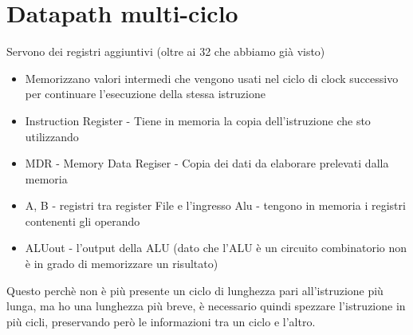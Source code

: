 \documentclass[12pt, a4paper, openany]{book}
\begin{document}
\section{Datapath multi-ciclo}
Servono dei registri aggiuntivi (oltre ai 32 che abbiamo già visto)
\begin{itemize}
    \item Memorizzano valori intermedi che vengono usati nel ciclo di clock successivo
    per continuare l'esecuzione della stessa istruzione
    \item Instruction Register - Tiene in memoria la copia dell'istruzione che sto utilizzando
    \item MDR - Memory Data Regiser - Copia dei dati da elaborare prelevati dalla memoria 
    \item A, B - registri tra register File e l'ingresso Alu - tengono in memoria i registri contenenti gli operando
    \item ALUout - l'output della ALU (dato che l'ALU è un circuito combinatorio non è in 
    grado di memorizzare un risultato)
\end{itemize}
Questo perchè non è più presente un ciclo di lunghezza pari all'istruzione più lunga,
ma ho una lunghezza più breve, è necessario quindi spezzare l'istruzione in più cicli,
preservando però le informazioni tra un ciclo e l'altro.
\end{document}
